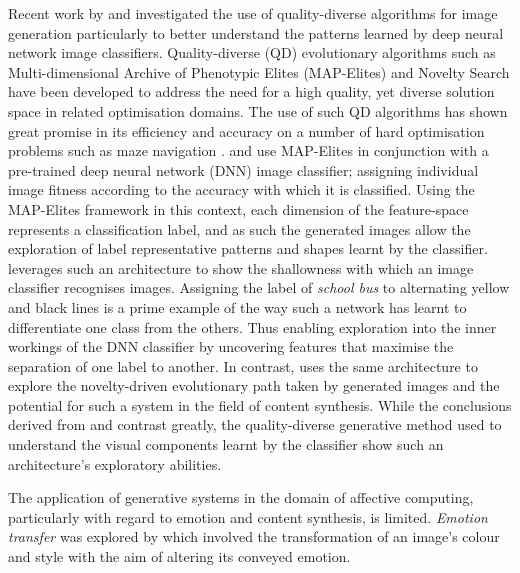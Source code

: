 \documentclass{article}
\begin{document}
Recent work by \citet{nguyen2015innovation} and \citet{nguyen2015deep} investigated the use of quality-diverse algorithms for image generation particularly to better understand the patterns learned by deep neural network image classifiers.
Quality-diverse (QD) evolutionary algorithms such as Multi-dimensional Archive of Phenotypic Elites (MAP-Elites) \citep{mouret2015illuminating} and Novelty Search \citep{lehman2008exploiting, lehman2011abandoning} have been developed to address the need for a high quality, yet diverse solution space in related optimisation domains.
The use of such QD algorithms has shown great promise in its efficiency and accuracy on a number of hard optimisation problems \citep{pugh2016quality} such as maze navigation \citep{lehman2011abandoning}.
\citet{nguyen2015deep} and \citet{nguyen2015innovation} use MAP-Elites in conjunction with a pre-trained deep neural network (DNN) image classifier; assigning individual image fitness according to the accuracy with which it is classified.
Using the MAP-Elites framework in this context, each dimension of the feature-space represents a classification label, and as such the generated images allow the exploration of label representative patterns and shapes learnt by the classifier.
\citet{nguyen2015deep} leverages such an architecture to show the shallowness with which an image classifier recognises images.
Assigning the label of \textit{school bus} to alternating yellow and black lines is a prime example of the way such a network has learnt to differentiate one class from the others.
Thus enabling exploration into the inner workings of the DNN classifier by uncovering features that maximise the separation of one label to another.
In contrast, \citet{nguyen2015innovation} uses the same architecture to explore the novelty-driven evolutionary path taken by generated images and the potential for such a system in the field of content synthesis.
While the conclusions derived from \citet{nguyen2015innovation} and \citet{nguyen2015deep} contrast greatly, the quality-diverse generative method used to understand the visual components learnt by the classifier show such an architecture's exploratory abilities.


The application of generative systems in the domain of affective computing, particularly with regard to emotion and content synthesis, is limited.
\textit{Emotion transfer} was explored by \citet{ali2017emotional} which involved the transformation of an image's colour and style with the aim of altering its conveyed emotion.
\end{document}

